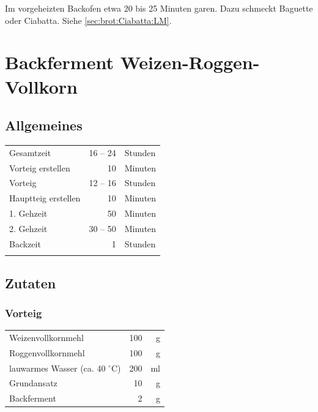 \documentclass[10pt,a4paper,ngerman, DIV=16]{scrartcl}
\begin{document}
Im vorgeheizten Backofen etwa 20 bis 25 Minuten garen. Dazu schmeckt Baguette oder Ciabatta. Siehe \vref{sec:brot:Ciabatta:LM}.

\section{Backferment Weizen-Roggen-Vollkorn} 
\subsection*{Allgemeines}
\begin{tabular}{lrl}
    Gesamtzeit          & 16 --  24 & Stunden                       \\
    Vorteig erstellen   &        10 & Minuten                       \\
    Vorteig             &  12 -- 16 & Stunden                       \\
    Hauptteig erstellen &        10 & Minuten                       \\
    1. Gehzeit          &        50 & Minuten                       \\
    2. Gehzeit          &  30 -- 50 & Minuten                       \\
    Backzeit            &         1 & Stunden                       \\
    &           & \cite[Seite 66 ]{Pokorny2016}
\end{tabular} 
\subsection*{Zutaten}

\subsubsection*{Vorteig}
\begin{tabular}{lrr}
    Weizenvollkornmehl                  & 100 &  g \\
    Roggenvollkornmehl                  & 100 &  g \\
    lauwarmes Wasser (ca. 40 $^\circ$C) & 200 & ml \\
    Grundansatz                         &  10 &  g \\
    Backferment                         &   2 &  g
\end{tabular} 
\end{document}
